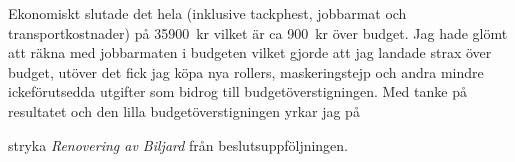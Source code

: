 \documentclass[../_main/handlingar.tex]{subfiles}
\begin{document}
\newpage

Ekonomiskt slutade det hela (inklusive tackphest, jobbarmat och transportkostnader) på
\SI{35900}{kr} vilket är ca \SI{900}{kr} över budget. Jag hade glömt att räkna med jobbarmaten i budgeten
vilket gjorde att jag landade strax över budget, utöver det fick jag köpa nya rollers,
maskeringstejp och andra mindre ickeförutsedda utgifter som bidrog till
budgetöverstigningen. Med tanke på resultatet och den lilla budgetöverstigningen yrkar jag
på

\begin{attsatser}
    \att stryka \emph{Renovering av Biljard} från beslutsuppföljningen.
\end{attsatser}

\begin{signatures}{1}
    \signature{Adam Belfrage}{}
\end{signatures}
\end{document}
